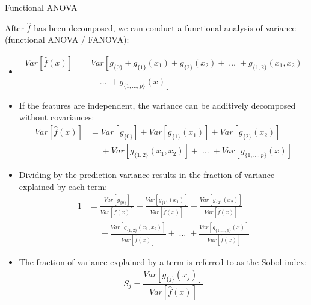 \documentclass[11pt,compress,t,notes=noshow, xcolor=table]{beamer}
\newcommand{\predvar}{Var\left[\hat{f}(x)\right]}
\begin{document}
\begin{vbframe}{Functional ANOVA}

After $\hat{f}$ has been decomposed, we can conduct a functional analysis of variance (functional ANOVA / FANOVA):
\begin{itemize}
\item
\begin{align*}
Var\left[\hat{f}(x)\right] &= Var\left[g_{\{0\}} + g_{\{1\}}(x_1) + g_{\{2\}}(x_2) + \;\dots\; + g_{\{1, 2\}}(x_1, x_2) \right. \\
&\phantom{{}={}} \left. + \;\dots\; + g_{\{1,\ldots,p\}}(x) \right]
\end{align*}
\item If the features are independent, the variance can be additively decomposed without covariances:
\begin{align*}
Var\left[\hat{f}(x)\right] &= Var\left[g_{\{0\}}\right] + Var\left[g_{\{1\}}(x_1)\right] + Var\left[g_{\{2\}}(x_2)\right] \\
&\phantom{{}={}} + Var\left[g_{\{1, 2\}}(x_1, x_2)\right] + \;\dots\; + Var\left[g_{\{1,\ldots,p\}}(x)\right]
\end{align*}
\item Dividing by the prediction variance results in the fraction of variance explained by each term:
\begin{align*}
1 &= \frac{Var\left[g_{\{0\}}\right]}{\predvar} + \frac{Var\left[g_{\{1\}}(x_1)\right]}{\predvar} + \frac{Var\left[g_{\{2\}}(x_2)\right]}{\predvar} \\
&\phantom{{}={}} + \frac{Var\left[g_{\{1, 2\}}(x_1, x_2)\right]}{\predvar} + \;\dots\; + \frac{Var\left[g_{\{1,\ldots,p\}}(x)\right]}{\predvar}
\end{align*}

\item The fraction of variance explained by a term is referred to as the Sobol index:
$$
S_j = \frac{Var\left[g_{\{j\}}(x_j)\right]}{Var\left[\hat{f}(x)\right]}
$$
\end{itemize}

\end{vbframe}


\endlecture
\end{document}
